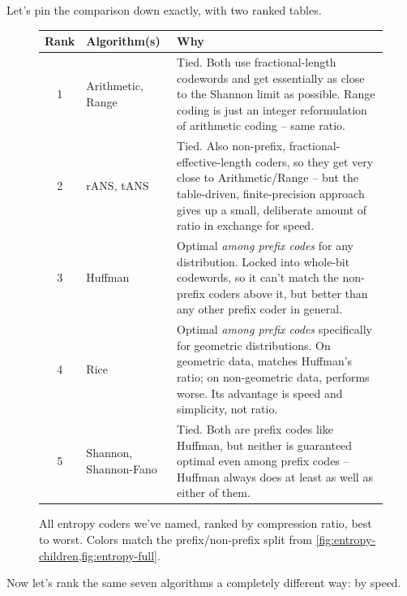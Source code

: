 \documentclass[11pt]{article}
\begin{document}
Let's pin the comparison down exactly, with two ranked tables.

\begin{figure}[H]
\centering
\begin{tabular}{@{}cp{4.0cm}p{6.5cm}@{}}
\toprule
\textbf{Rank} & \textbf{Algorithm(s)} & \textbf{Why} \\
\midrule
1 & \textcolor{nonprefixcol}{Arithmetic}, \textcolor{nonprefixcol}{Range} &
Tied. Both use fractional-length codewords and get essentially as close to
the Shannon limit as possible. Range coding is just an integer
reformulation of arithmetic coding -- same ratio. \\[4pt]
2 & \textcolor{nonprefixcol}{rANS}, \textcolor{bestcol}{tANS} &
Tied. Also non-prefix, fractional-effective-length coders, so they get very
close to Arithmetic/Range -- but the table-driven, finite-precision approach
gives up a small, deliberate amount of ratio in exchange for speed. \\[4pt]
3 & \textcolor{prefixcol}{Huffman} &
Optimal \emph{among prefix codes} for any distribution. Locked into
whole-bit codewords, so it can't match the non-prefix coders above it, but
better than any other prefix coder in general. \\[4pt]
4 & \textcolor{prefixcol}{Rice} &
Optimal \emph{among prefix codes} specifically for geometric distributions.
On geometric data, matches Huffman's ratio; on non-geometric data, performs
worse. Its advantage is speed and simplicity, not ratio. \\[4pt]
5 & \textcolor{prefixcol}{Shannon}, \textcolor{prefixcol}{Shannon-Fano} &
Tied. Both are prefix codes like Huffman, but neither is guaranteed optimal
even among prefix codes -- Huffman always does at least as well as either of
them. \\
\bottomrule
\end{tabular}
\caption{All entropy coders we've named, ranked by
compression ratio, best to worst. Colors match the prefix/non-prefix split
from \cref{fig:entropy-children,fig:entropy-full}.}
\label{fig:entropy-ratio-rank}
\end{figure}

Now let's rank the same seven algorithms a completely different way: by speed.
\end{document}
